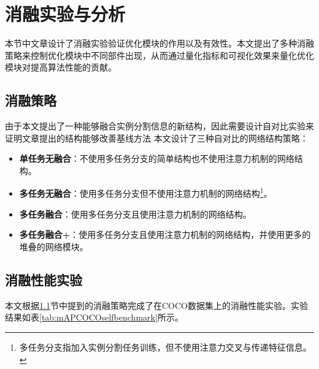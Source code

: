 

\section{消融实验与分析}
\label{sec:ablation}
本节中文章设计了消融实验验证优化模块的作用以及有效性。本文提出了多种消融策略来控制优化模块中不同部件出现，从而通过量化指标和可视化效果来量化优化模块对提高算法性能的贡献。
\subsection{消融策略}
\label{subsec:selfstrategy}
由于本文提出了一种能够融合实例分割信息的新结构，因此需要设计自对比实验来证明文章提出的结构能够改善基线方法
本文设计了三种自对比的网络结构策略：
\begin{itemize}
	\item \textbf{单任务无融合}：不使用多任务分支的简单结构也不使用注意力机制的网络结构。
	\item \textbf{多任务无融合}：使用多任务分支但不使用注意力机制的网络结构\footnote{多任务分支指加入实例分割任务训练，但不使用注意力交叉与传递特征信息。}。
	\item \textbf{多任务融合}：使用多任务分支且使用注意力机制的网络结构。
	\item \textbf{多任务融合+}：使用多任务分支且使用注意力机制的网络结构，并使用更多的堆叠的网络模块。
\end{itemize}

\subsection{消融性能实验}
\label{subsec:selfeval}

本文根据\ref{subsec:selfstrategy}节中提到的消融策略完成了在COCO数据集上的消融性能实验。实验结果如表\ref{tab:mAPCOCOselfbenchmark}所示。

